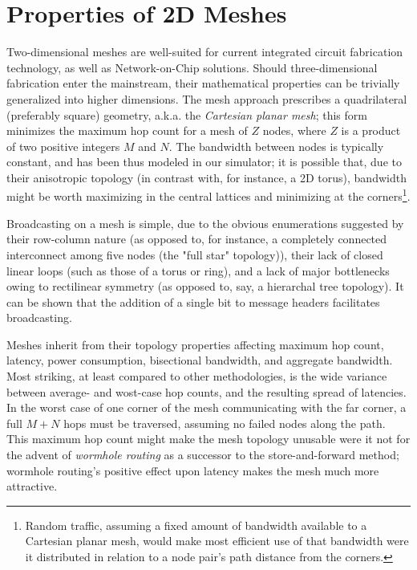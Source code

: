\documentclass[twocolumn]{article}
\begin{document}
\section{Properties of 2D Meshes}
Two-dimensional meshes are well-suited for current integrated circuit
fabrication technology, as well as Network-on-Chip solutions. Should
three-dimensional fabrication enter the mainstream, their mathematical
properties can be trivially generalized into higher dimensions. The mesh
approach prescribes a quadrilateral (preferably square) geometry, a.k.a. the
\textit{Cartesian planar mesh}; this form minimizes the maximum hop count for a
mesh of $Z$ nodes, where $Z$ is a product of two positive integers $M$ and $N$.
The bandwidth between nodes is typically constant, and has been thus modeled in
our simulator; it is possible that, due to their anisotropic topology (in
contrast with, for instance, a 2D torus), bandwidth might be worth maximizing in
the central lattices and minimizing at the corners\footnote{Random traffic,
assuming a fixed amount of bandwidth available to a Cartesian planar mesh,
would make most efficient use of that bandwidth were it distributed in relation
to a node pair's path distance from the corners.}.

Broadcasting on a mesh is simple, due to the obvious enumerations suggested by
their row-column nature (as opposed to, for instance, a completely connected
interconnect among five nodes (the "full star" topology)), their lack of closed
linear loops (such as those of a torus or ring), and a lack of major
bottlenecks owing to rectilinear symmetry (as opposed to, say, a hierarchal
tree topology). It can be shown that the addition of a single bit to message
headers facilitates broadcasting.

Meshes inherit from their topology properties affecting maximum hop count,
latency, power consumption, bisectional bandwidth, and aggregate bandwidth.
Most striking, at least compared to other methodologies, is the wide variance
between average- and wost-case hop counts, and the resulting spread of
latencies. In the worst case of one corner of the mesh communicating with the
far corner, a full $M+N$ hops must be traversed, assuming no failed nodes along
the path. This maximum hop count might make the mesh topology unusable were it
not for the advent of \textit{wormhole routing} as a successor to the
store-and-forward method; wormhole routing's positive effect upon latency makes
the mesh much more attractive.
\end{document}
